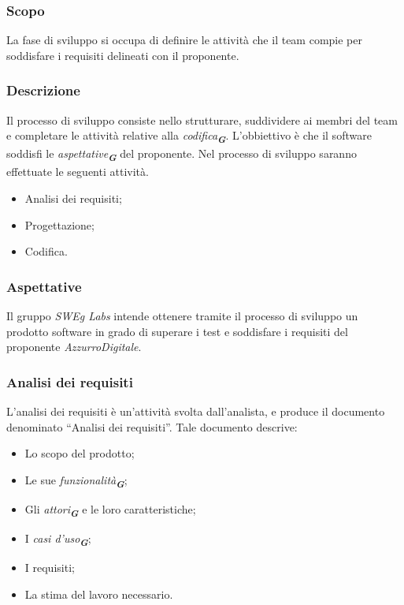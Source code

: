 \begin{enumerate}
\subsubsection{Scopo}
La fase di sviluppo si occupa di definire le attività che il team compie per soddisfare i requisiti delineati con il proponente.

\subsubsection{Descrizione}
Il processo di sviluppo consiste nello strutturare, suddividere ai membri del team e completare le attività relative alla \emph{codifica}\textsubscript{\textit{\textbf{G}}}. L’obbiettivo è che il software soddisfi le \emph{aspettative}\textsubscript{\textit{\textbf{G}}} del proponente.
Nel processo di sviluppo saranno effettuate le seguenti attività.
\begin{itemize}
    \item Analisi dei requisiti;
    \item Progettazione;
    \item Codifica.
\end{itemize}

\subsubsection{Aspettative}
Il gruppo \emph{SWEg Labs} intende ottenere tramite il processo di sviluppo un prodotto software in grado di superare i test e soddisfare i requisiti del proponente \emph{AzzurroDigitale}.

\subsubsection{Analisi dei requisiti}
\label{sec:analisi_dei_requisiti}

L’analisi dei requisiti è un’attività svolta dall’analista, e produce il documento denominato “Analisi dei requisiti”. 
Tale documento descrive:
\begin{itemize}
    \item Lo scopo del prodotto;
    \item Le sue \emph{funzionalità}\textsubscript{\textit{\textbf{G}}};
    \item Gli \emph{attori}\textsubscript{\textit{\textbf{G}}} e le loro caratteristiche;
    \item I \emph{casi d'uso}\textsubscript{\textit{\textbf{G}}};
    \item I requisiti;
    \item La stima del lavoro necessario.
\end{itemize}


\end{enumerate}
